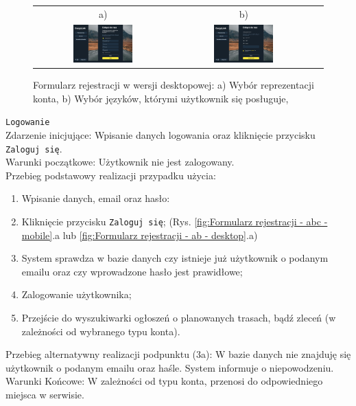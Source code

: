 \begin{figure}[H]
 \centering
  \begin{tabular}{@{}ccc@{}}
  a) & b)\\
  \includegraphics[width=0.45\textwidth]{rozdzial1/wybor_2_d.jpg} &
  \includegraphics[width=0.45\textwidth]{rozdzial1/wybor_3_d.jpg}
  \end{tabular}
 \caption{Formularz rejestracji w wersji desktopowej: a) Wybór reprezentacji konta, b) Wybór języków, którymi użytkownik się posługuje, }
 \label{fig:Formularz rejestracji - ab2 - desktop}
\end{figure}

\texttt{Logowanie} \\
Zdarzenie inicjujące: Wpisanie danych logowania oraz kliknięcie przycisku \texttt{Zaloguj się}. \\
Warunki początkowe: Użytkownik nie jest zalogowany. \\
Przebieg podstawowy realizacji przypadku użycia:
\begin{enumerate}
    \item Wpisanie danych, email oraz hasło:
    \item Kliknięcie przycisku \texttt{Zaloguj się}; (Rys. \ref{fig:Formularz rejestracji - abc - mobile}.a lub \ref{fig:Formularz rejestracji - ab - desktop}.a)
    \item System sprawdza w bazie danych czy istnieje już użytkownik o podanym emailu oraz czy wprowadzone hasło jest prawidłowe;
    \item Zalogowanie użytkownika;
    \item Przejście do wyszukiwarki ogłoszeń o planowanych trasach, bądź zleceń (w zależności od wybranego typu konta).
\end{enumerate}
Przebieg alternatywny realizacji podpunktu (3a): W bazie danych nie znajduję się użytkownik o podanym emailu oraz haśle. System informuje o niepowodzeniu. \\
Warunki Końcowe: W zależności od typu konta, przenosi do odpowiedniego miejsca w serwisie.\\

